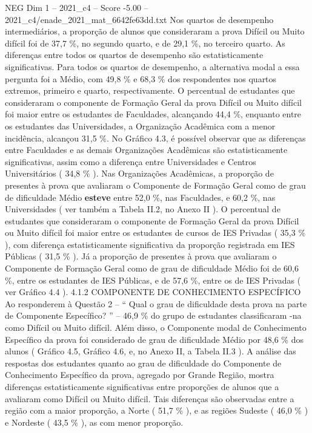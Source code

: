 \begin{textsample}{NEG Dim 1 – 2021\_c4 – Score -5.00 – 2021\_c4/enade\_2021\_mat\_6642fe63dd.txt}
Nos quartos de desempenho intermediários, a proporção de alunos que consideraram a prova Difícil ou Muito difícil foi de 37,7 \%, no segundo quarto, e de 29,1 \%, no terceiro quarto.
As diferenças entre todos os quartos de desempenho são estatisticamente significativas.
Para todos os quartos de desempenho, a alternativa modal a essa pergunta foi a Médio, com 49,8 \% e 68,3 \% dos respondentes nos quartos extremos, primeiro e quarto, respectivamente.
O percentual de estudantes que consideraram o componente de Formação Geral da prova Difícil ou Muito difícil foi maior entre os estudantes de Faculdades, alcançando 44,4 \%, enquanto entre os estudantes das Universidades, a Organização Acadêmica com a menor incidência, alcançou 31,5 \%.
No Gráfico 4.3, é possível observar que as diferenças entre Faculdades e as demais Organizações Acadêmicas são estatisticamente significativas, assim como a diferença entre Universidades e Centros Universitários ( 34,8 \% ).
Nas Organizações Acadêmicas, a proporção de presentes à prova que avaliaram o Componente de Formação Geral como de grau de dificuldade Médio \textbf{esteve} entre 52,0 \%, nas Faculdades, e 60,2 \%, nas Universidades ( ver também a Tabela II.2, no Anexo II ).
O percentual de estudantes que consideraram o componente de Formação Geral da prova Difícil ou Muito difícil foi maior entre os estudantes de cursos de IES Privadas ( 35,3 \% ), com diferença estatisticamente significativa da proporção registrada em IES Públicas ( 31,5 \% ).
Já a proporção de presentes à prova que avaliaram o Componente de Formação Geral como de grau de dificuldade Médio foi de 60,6 \%, entre os estudantes de IES Públicas, e de 57,6 \%, entre os de IES Privadas ( ver Gráfico 4.4 ). 4.1.2 COMPONENTE DE CONHECIMENTO ESPECÍFICO Ao responderem à Questão 2 – “ Qual o grau de dificuldade desta prova na parte de Componente Específico? ” – 46,9 \% do grupo de estudantes classificaram -na como Difícil ou Muito difícil.
Além disso, o Componente modal de Conhecimento Específico da prova foi considerado de grau de dificuldade Médio por 48,6 \% dos alunos ( Gráfico 4.5, Gráfico 4.6, e, no Anexo II, a Tabela II.3 ).
A análise das respostas dos estudantes quanto ao grau de dificuldade do Componente de Conhecimento Específico da prova, agregado por Grande Região, mostra diferenças estatisticamente significativas entre proporções de alunos que a avaliaram como Difícil ou Muito difícil.
Tais diferenças são observadas entre a região com a maior proporção, a Norte ( 51,7 \% ), e as regiões Sudeste ( 46,0 \% ) e Nordeste ( 43,5 \% ), as com menor proporção.

\end{textsample}
